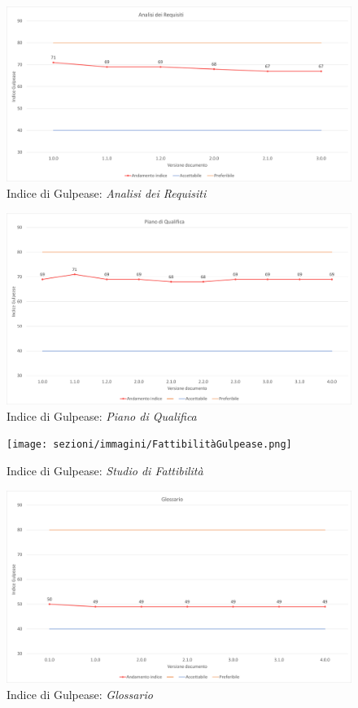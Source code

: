 \begin{figure}[!ht]
    \caption{Indice di Gulpease: \textit{Analisi dei Requisiti}}
    \vspace{10px}
    \includegraphics[scale=0.5]{sezioni/immagini/AnalisiGulpease.png}
    \centering
\end{figure}
\pagebreak
\begin{figure}[!ht]
    \caption{Indice di Gulpease: \textit{Piano di Qualifica}}
    \vspace{10px}
    \includegraphics[scale=0.5]{sezioni/immagini/PianoQualificaGulpease.png}
    \centering
\end{figure}
\begin{figure}[!ht]
    \caption{Indice di Gulpease: \textit{Studio di Fattibilità}}
    \vspace{10px}
    \texttt{[image: sezioni/immagini/FattibilitàGulpease.png]}
    \centering
\end{figure}
\pagebreak
\begin{figure}[!ht]
    \caption{Indice di Gulpease: \textit{Glossario}}
    \vspace{10px}
    \includegraphics[scale=0.5]{sezioni/immagini/GlossarioGulpease.png}
    \centering
\end{figure}
